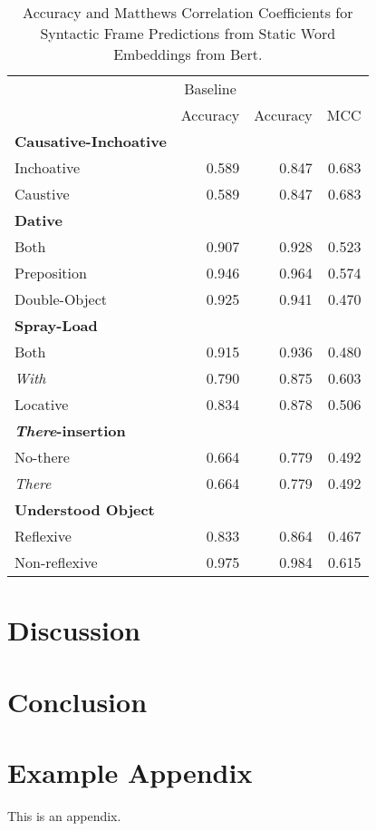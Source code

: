 \documentclass[11pt]{article}
\begin{document}
\begin{table*}
\begin{tabular}{lrrr}
\toprule
{} &  \multicolumn{1}{c}{Baseline} &           &    \\
{} &  \multicolumn{1}{c}{Accuracy} &  Accuracy & MCC \\
\midrule
\textbf{Causative-Inchoative} &        &        &        \\
Inchoative           &  0.589 &  0.847 &  0.683 \\
Caustive             &  0.589 &  0.847 &  0.683 \\
\addlinespace[6pt]
\textbf{Dative}      &        &        &        \\
Both                 &  0.907 &  0.928 &  0.523 \\
Preposition          &  0.946 &  0.964 &  0.574 \\
Double-Object        &  0.925 &  0.941 &  0.470 \\
\addlinespace[6pt]
\textbf{Spray-Load}  &        &        &        \\
Both                 &  0.915 &  0.936 &  0.480 \\
\textit{With}        &  0.790 &  0.875 &  0.603 \\
Locative             &  0.834 &  0.878 &  0.506 \\
\addlinespace[6pt]
\textbf{\textit{There}-insertion} & &  &        \\
No-there             &  0.664 &  0.779 &  0.492 \\
\textit{There}       &  0.664 &  0.779 &  0.492 \\
\addlinespace[6pt]
\textbf{Understood Object}  &        &        &        \\
Reflexive            &  0.833 &  0.864 &  0.467 \\
Non-reflexive        &  0.975 &  0.984 &  0.615 \\
\bottomrule
\end{tabular}
\caption{Accuracy and Matthews Correlation Coefficients for Syntactic Frame Predictions from Static Word Embeddings from Bert.}
\label{tab:word-embeddings-results}
\end{table*}

\section{Discussion}
\section{Conclusion}



\appendix

\section{Example Appendix}
\label{sec:appendix}

This is an appendix.
\end{document}
